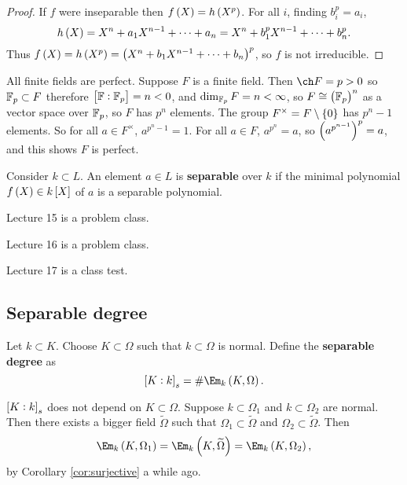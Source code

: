 \begin{proof}
If $ f $ were inseparable then $ f\br{X} = h\br{X^p} $. For all $ i $, finding $ b_i^p = a_i $,
$$ h\br{X} = X^n + a_1X^{n - 1} + \dots + a_n = X^n + b_1^pX^{n - 1} + \dots + b_n^p. $$
Thus $ f\br{X} = h\br{X^p} = \br{X^n + b_1X^{n - 1} + \dots + b_n}^p $, so $ f $ is not irreducible.
\end{proof}

\begin{example*}
All finite fields are perfect. Suppose $ F $ is a finite field. Then $ \ch F = p > 0 $ so $ \mathbb{F}_p \subset F $ therefore $ \sbr{\FF : \FF_p} = n < 0 $, and $ \dim_{\mathbb{F}_p} F = n < \infty $, so $ F \cong \br{\FF_p}^n $ as a vector space over $ \mathbb{F}_p $, so $ F $ has $ p^n $ elements. The group $ F^\times = F \setminus \cbr{0} $ has $ p^n - 1 $ elements. So for all $ a \in F^\times $, $ a^{p^n - 1} = 1 $. For all $ a \in F $, $ a^{p^n} = a $, so $ \br{a^{p^{n - 1}}}^p = a $, and this shows $ F $ is perfect.
\end{example*}

\begin{definition}
Consider $ k \subset L $. An element $ a \in L $ is \textbf{separable} over $ k $ if the minimal polynomial $ f\br{X} \in k\sbr{X} $ of $ a $ is a separable polynomial.
\end{definition}


Lecture 15 is a problem class.


Lecture 16 is a problem class.


Lecture 17 is a class test.

\subsection{Separable degree}


\begin{definition}
Let $ k \subset K $. Choose $ K \subset \Omega $ such that $ k \subset \Omega $ is normal. Define the \textbf{separable degree} as
$$ \sbr{K : k}_s = \#\Em_k\br{K, \Omega}. $$
\end{definition}

\begin{remark*}
$ \sbr{K : k}_s $ does not depend on $ K \subset \Omega $. Suppose $ k \subset \Omega_1 $ and $ k \subset \Omega_2 $ are normal. Then there exists a bigger field $ \widetilde{\Omega} $ such that $ \Omega_1 \subset \widetilde{\Omega} $ and $ \Omega_2 \subset \widetilde{\Omega} $. Then
$$ \Em_k\br{K, \Omega_1} = \Em_k\br{K, \widetilde{\Omega}} = \Em_k\br{K, \Omega_2}, $$
by Corollary \ref{cor:surjective} a while ago.
\end{remark*}


